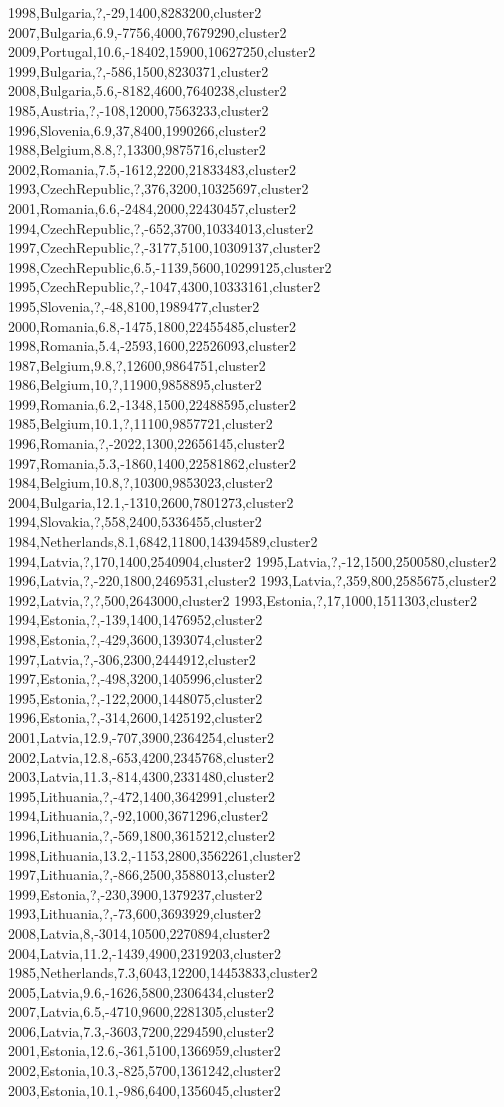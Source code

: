 1998,Bulgaria,?,-29,1400,8283200,cluster2
2007,Bulgaria,6.9,-7756,4000,7679290,cluster2
2009,Portugal,10.6,-18402,15900,10627250,cluster2
1999,Bulgaria,?,-586,1500,8230371,cluster2
2008,Bulgaria,5.6,-8182,4600,7640238,cluster2
1985,Austria,?,-108,12000,7563233,cluster2
1996,Slovenia,6.9,37,8400,1990266,cluster2
1988,Belgium,8.8,?,13300,9875716,cluster2
2002,Romania,7.5,-1612,2200,21833483,cluster2
1993,CzechRepublic,?,376,3200,10325697,cluster2
2001,Romania,6.6,-2484,2000,22430457,cluster2
1994,CzechRepublic,?,-652,3700,10334013,cluster2
1997,CzechRepublic,?,-3177,5100,10309137,cluster2
1998,CzechRepublic,6.5,-1139,5600,10299125,cluster2
1995,CzechRepublic,?,-1047,4300,10333161,cluster2
1995,Slovenia,?,-48,8100,1989477,cluster2
2000,Romania,6.8,-1475,1800,22455485,cluster2
1998,Romania,5.4,-2593,1600,22526093,cluster2
1987,Belgium,9.8,?,12600,9864751,cluster2
1986,Belgium,10,?,11900,9858895,cluster2
1999,Romania,6.2,-1348,1500,22488595,cluster2
1985,Belgium,10.1,?,11100,9857721,cluster2
1996,Romania,?,-2022,1300,22656145,cluster2
1997,Romania,5.3,-1860,1400,22581862,cluster2
1984,Belgium,10.8,?,10300,9853023,cluster2
2004,Bulgaria,12.1,-1310,2600,7801273,cluster2
1994,Slovakia,?,558,2400,5336455,cluster2
1984,Netherlands,8.1,6842,11800,14394589,cluster2
1994,Latvia,?,170,1400,2540904,cluster2
1995,Latvia,?,-12,1500,2500580,cluster2
1996,Latvia,?,-220,1800,2469531,cluster2
1993,Latvia,?,359,800,2585675,cluster2
1992,Latvia,?,?,500,2643000,cluster2
1993,Estonia,?,17,1000,1511303,cluster2
1994,Estonia,?,-139,1400,1476952,cluster2
1998,Estonia,?,-429,3600,1393074,cluster2
1997,Latvia,?,-306,2300,2444912,cluster2
1997,Estonia,?,-498,3200,1405996,cluster2
1995,Estonia,?,-122,2000,1448075,cluster2
1996,Estonia,?,-314,2600,1425192,cluster2
2001,Latvia,12.9,-707,3900,2364254,cluster2
2002,Latvia,12.8,-653,4200,2345768,cluster2
2003,Latvia,11.3,-814,4300,2331480,cluster2
1995,Lithuania,?,-472,1400,3642991,cluster2
1994,Lithuania,?,-92,1000,3671296,cluster2
1996,Lithuania,?,-569,1800,3615212,cluster2
1998,Lithuania,13.2,-1153,2800,3562261,cluster2
1997,Lithuania,?,-866,2500,3588013,cluster2
1999,Estonia,?,-230,3900,1379237,cluster2
1993,Lithuania,?,-73,600,3693929,cluster2
2008,Latvia,8,-3014,10500,2270894,cluster2
2004,Latvia,11.2,-1439,4900,2319203,cluster2
1985,Netherlands,7.3,6043,12200,14453833,cluster2
2005,Latvia,9.6,-1626,5800,2306434,cluster2
2007,Latvia,6.5,-4710,9600,2281305,cluster2
2006,Latvia,7.3,-3603,7200,2294590,cluster2
2001,Estonia,12.6,-361,5100,1366959,cluster2
2002,Estonia,10.3,-825,5700,1361242,cluster2
2003,Estonia,10.1,-986,6400,1356045,cluster2
